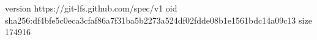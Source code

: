 version https://git-lfs.github.com/spec/v1
oid sha256:df4bfe5c0eca3cfaf86a7f31ba5b2273a524df02fdde08b1e1561bdc14a09c13
size 174916
